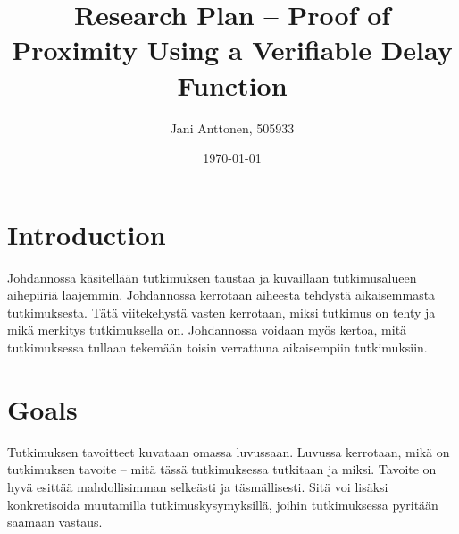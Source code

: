 \documentclass[a4paper,12pt]{report}
\title{Research Plan – Proof of Proximity Using a Verifiable Delay Function}
\author{Jani Anttonen, 505933}
\date{\today}
\begin{document}

\maketitle        %

\section{Introduction}
Johdannossa käsitellään tutkimuksen taustaa ja kuvaillaan tutkimusalueen aihepiiriä
laajemmin. Johdannossa kerrotaan aiheesta tehdystä aikaisemmasta tutkimuksesta. Tätä
viitekehystä vasten kerrotaan, miksi tutkimus on tehty ja mikä merkitys tutkimuksella on.
Johdannossa voidaan myös kertoa, mitä tutkimuksessa tullaan tekemään toisin verrattuna
aikaisempiin tutkimuksiin. 

\section{Goals}
Tutkimuksen tavoitteet kuvataan omassa luvussaan. Luvussa kerrotaan, mikä on
tutkimuksen tavoite – mitä tässä tutkimuksessa tutkitaan ja miksi. Tavoite on hyvä esittää
mahdollisimman selkeästi ja täsmällisesti. Sitä voi lisäksi konkretisoida muutamilla
tutkimuskysymyksillä, joihin tutkimuksessa pyritään saamaan vastaus. 
\end{document}
